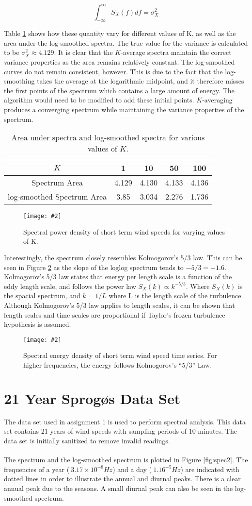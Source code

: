 \documentclass[11pt]{article}
\newcommand{\myFigure}[4][0.8]{
\begin{figure}[H] 

	\centering
	\setlength\fboxsep{1pt}
	\setlength\fboxrule{0.5pt}
	\texttt{[image: \#2]}
	\caption{\small #3}
	\label{#4}
\end{figure}
}
\begin{document}
$$\int_{-\infty}^\infty S_X(f)df = \sigma_X^2$$

Table \ref{table:var} shows how these quantity vary for different values of K, as well as the area under the log-smoothed spectra. The true value for the variance is calculated to be $\sigma_X^2\approx 4.129$. It is clear that the $K$-average spectra maintain the correct variance properties as the area remains relatively constant. The log-smoothed curves do not remain consistent, however. This is due to the fact that the log-smoothing takes the average at the logarithmic midpoint, and it therefore misses the first points of the spectrum which contains a large amount of energy. The algorithm would need to be modified to add these initial points. $K$-averaging produces a converging spectrum while maintaining the variance properties of the spectrum. 
\begin{table}[H]
\centering
\begin{tabular}{|c |c|c|c|c|}
\hline
$K$ & 1 & 10 & 50 & 100 \\
\hline
Spectrum Area & 4.129& 4.130& 4.133&4.136\\
log-smoothed Spectrum Area & 3.85& 3.034& 2.276&1.736\\
\hline
\end{tabular}
\caption{Area under spectra and log-smoothed spectra for various values of $K$.  }
\label{table:var}
\end{table}
\myFigure{Figures/figKspecs}{Spectral power density of short term wind speeds for varying values of K.}{fig:specK}

Interestingly, the spectrum closely resembles Kolmogorov's 5/3 law. This can be seen in Figure \ref{fig:spec53} as the slope of the loglog spectrum tends to $-5/3=-1.\bar{6}$. Kolmogorov's 5/3 law states that energy per length scale is a function of the eddy length scale, and follows the power law $S_X(k) \propto k^{-5/3}$. Where $S_X(k)$ is the spacial spectrum, and $k=1/L$ where L is the length scale of the turbulence. Although Kolmogorov's 5/3 law applies to length scales, it can be shown that length scales and time scales are proportional if Taylor's frozen turbulence hypothesis is assumed. 
\myFigure{Figures/fig53Law}{Spectral energy density of short term wind speed time series. For higher frequencies, the energy follows Kolmogorov’s “5/3” Law.}{fig:spec53}



\section{21 Year Sprog\o s Data Set}
The data set used in assignment 1 is used to perform spectral analysis. This data set contains 21 years of wind speeds with sampling periods of 10 minutes. The data set is initially sanitized to remove invalid readings.
\\~\\
The spectrum and the log-smoothed spectrum is plotted in Figure \ref{fig:spec2}. The frequencies of a year ($~3.17\times10^{-8}Hz$) and a day ($~1.16^{-5}Hz$) are indicated with dotted lines in order to illustrate the annual and diurnal peaks. There is a clear annual peak due to the seasons. A small diurnal peak can also be seen in the log-smoothed spectrum. 
\end{document}
